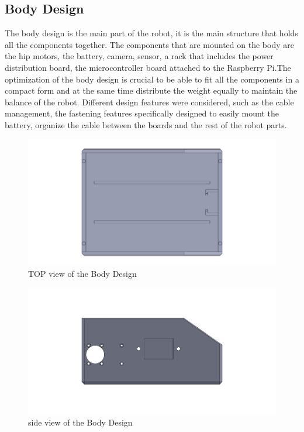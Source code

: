 \subsection{Body Design}
The body design is the main part of the robot, it is the main structure that holds all the components together.
The components that are mounted on the body are the hip motors, the battery, camera, sensor, a rack that includes the power distribution board, the microcontroller board attached to the Raspberry Pi.The optimization of the body design is crucial to be able to fit all the components in a compact form and at the same time distribute the weight equally to maintain the balance of the robot.
Different design features were considered, such as the cable management, the fastening features specifically designed to easily mount the battery, organize the cable between the boards and the rest of the robot parts.
\begin{figure}[h]
	\centering
	\includegraphics[width=1\linewidth]{Body_Design_1}
	\caption[TOP view of the Body Design]{TOP view of the Body Design}
	\label{fig:bodydesign1}
\end{figure}
\begin{figure}[h]
	\centering
	\includegraphics[width=1\linewidth]{Body_Design_2}
	\caption[Side view of the Body Design]{side view of the Body Design}
	\label{fig:bodydesign2}
\end{figure}
